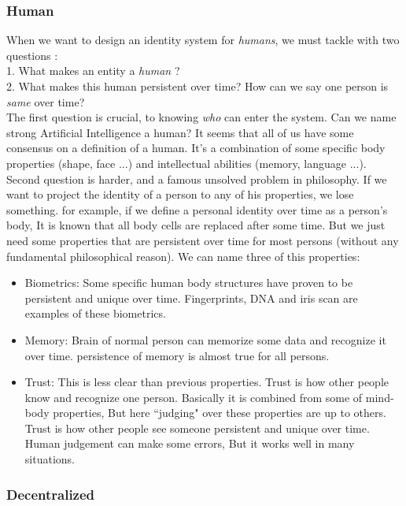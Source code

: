 \documentclass[conference]{IEEEtran}
\begin{document}
\subsubsection{Human}
When we want to design an identity system for \textit{humans}, we must tackle with two questions :
\\
1. What makes an entity a \textit{human} ?
\\
2. What makes this human persistent over time? How  can we say one person is \textit{same} over time?
\\
The first question is crucial, to knowing \textit{who} can enter the system. Can we name strong Artificial Intelligence a human? It seems that all of us have some consensus on a definition of a human. It's a combination of some specific body properties (shape, face ...) and intellectual abilities (memory, language ...). 
\\
Second question is harder, and a famous unsolved problem in philosophy. If we want to project the identity of a person to any of his properties, we lose something. for example, if we define a personal identity over time as a person's body, It is known that all body cells are replaced after some time. But we just need some properties that are persistent over time for most persons (without any fundamental philosophical reason). We can name three of this properties: 
\\
\begin{itemize}
\item{Biometrics:}
Some specific human body structures have proven to be persistent and unique over time. Fingerprints, DNA and iris scan are examples of these biometrics.
\item{Memory:}
Brain of normal person can memorize some data and recognize it over time. persistence of memory is almost true for all persons.
\item{Trust:}
This is less clear than previous properties. Trust is how other people know and recognize one person. Basically it is combined from some of mind-body properties, But here ``judging" over these properties are up to others. Trust is how other people see someone persistent and unique over time. Human judgement can make some errors, But it works well in many situations.
\end{itemize}



\subsubsection{Decentralized}
\end{document}
